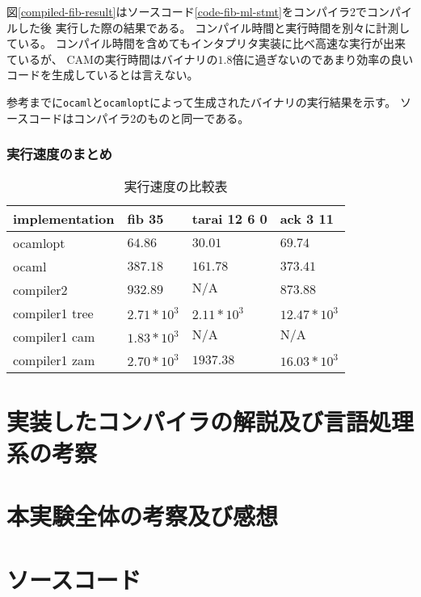 \documentclass[report]{jlreq}
\begin{document}
      図\ref{compiled-fib-result}はソースコード\ref{code-fib-ml-stmt}をコンパイラ2でコンパイルした後
      実行した際の結果である。
      コンパイル時間と実行時間を別々に計測している。
      コンパイル時間を含めてもインタプリタ実装に比べ高速な実行が出来ているが、
      CAMの実行時間はバイナリの$1.8$倍に過ぎないのであまり効率の良いコードを生成しているとは言えない。
      
      

      参考までに\texttt{ocaml}と\texttt{ocamlopt}によって生成されたバイナリの実行結果を示す。
      ソースコードはコンパイラ2のものと同一である。
      
    \subsection{実行速度のまとめ}
      \begin{table}[t]
        \centering
        \caption{実行速度の比較表}
        \begin{tabular}{l|lll}
        implementation & fib 35         & tarai 12 6 0                 & ack 3 11                      \\ \hline
        ocamlopt       & $64.86       $ & $ 30.01        $ & $ 69.74        $ \\
        ocaml          & $387.18      $ & $ 161.78       $ & $ 373.41       $ \\
        compiler2      & $932.89      $ & $ \mathrm{N/A} $ & $ 873.88       $ \\
        compiler1 tree & $2.71 * 10^3 $ & $ 2.11 * 10^3  $ & $ 12.47 * 10^3 $ \\
        compiler1 cam  & $1.83 * 10^3 $ & $ \mathrm{N/A} $ & $ \mathrm{N/A} $ \\
        compiler1 zam  & $2.70 * 10^3 $ & $ 1937.38      $ & $ 16.03 * 10^3 $
        \end{tabular}
      \end{table}
  \chapter{実装したコンパイラの解説及び言語処理系の考察}
  \chapter{本実験全体の考察及び感想}
  \chapter{ソースコード}
\end{document}
